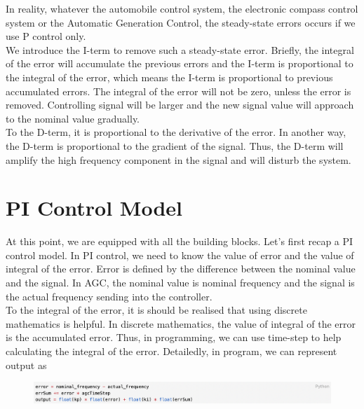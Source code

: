 \documentclass{report}
\begin{document}
In reality, whatever the automobile control system, the electronic compass control system or the Automatic Generation Control, the steady-state errors occurs if we use P control only.\\

We introduce the I-term to remove such a steady-state error. Briefly, the integral of the error will accumulate the previous errors and the I-term is proportional to the integral of the error, which means the I-term is proportional to previous accumulated errors. The integral of the error will not be zero, unless the error is removed. Controlling signal will be larger and the new signal value will approach to the nominal value gradually.\\

To the D-term, it is proportional to the derivative of the error. In another way, the D-term is proportional to the gradient of the signal. Thus, the D-term will amplify the high frequency component in the signal and will disturb the system.\\


\section{PI Control Model} %
At this point, we are equipped with all the building blocks. Let’s first recap a PI control model. In PI control, we need to know the value of error and the value of integral of the error. Error is defined by the difference between the nominal value and the signal. In AGC, the nominal value is nominal frequency and the signal is the actual frequency sending into the controller.\\

To the integral of the error,  it is should be realised that using discrete mathematics is helpful. In discrete mathematics, the value of integral of the error is the accumulated error. Thus, in programming, we can use time-step to help calculating the integral of the error.  Detailedly, in program, we can represent output as\\

\begin{figure}[htbp]
\centering
\includegraphics[width = \textwidth]{figure/3_3_code1.png}
\label{3_3_code1}
\end{figure}
\end{document}
